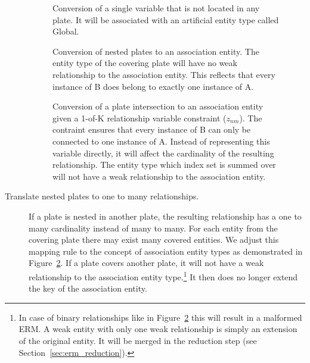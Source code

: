 \begin{description}
\begin{figure}[p]
\centering
\scalebox{\tikzScale}{\adjustTikzSize }
\caption{Conversion of a single variable that is not located in any plate. It will be associated with an artificial entity type called Global.}\label{fig:pm2erm_uno_global}
\end{figure}

\begin{figure}[p]
\centering
\scalebox{\tikzScale}{\adjustTikzSize }
\caption{Conversion of nested plates to an association entity. The entity type of the covering plate will have no weak relationship to the association entity. This reflects that every instance of B does belong to exactly one instance of A.}\label{fig:pm2erm_covered_1}
\end{figure}

\begin{figure}[p]
\centering
\scalebox{\tikzScale}{\adjustTikzSize }
\caption{Conversion of a plate intersection to an association entity given a 1-of-K relationship variable constraint ($z_{nm}$). The contraint ensures that every instance of B can only be connected to one instance of A. Instead of representing this variable directly, it will affect the cardinality of the resulting relationship. The entity type which index set is summed over will not have a weak relationship to the association entity.}\label{fig:pm2erm_bi_constraints}
\end{figure}

\item[Translate nested plates to one to many relationships.] If a plate is nested in another plate, the resulting relationship has a one to many cardinality instead of many to many. For each entity from the covering plate there may exist many covered entities. We adjust this mapping rule to the concept of association entity types as demonstrated in Figure~\ref{fig:pm2erm_covered_1}. If a plate covers another plate, it will not have a weak relationship to the association entity type.\footnote{In case of binary relationships like in Figure~\ref{fig:pm2erm_covered_1} this will result in a malformed ERM. A weak entity with only one weak relationship is simply an extension of the original entity. It will be merged in the reduction step (see Section~\ref{sec:erm_reduction}).} It then does no longer extend the key of the association entity.
\end{description}

